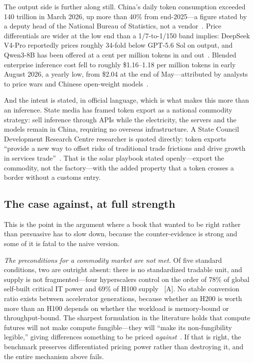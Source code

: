 The output side is further along still. China's daily token consumption exceeded 140 trillion in March 2026, up more than 40\% from end-2025---a figure stated by a deputy head of the National Bureau of Statistics, not a vendor~\cite{china-tokens}. Price differentials are wider at the low end than a 1/7-to-1/150 band implies: DeepSeek V4-Pro reportedly prices roughly 34-fold below GPT-5.6 Sol on output, and Qwen3-8B has been offered at a cent per million tokens in and out~\cite{token-prices}. Blended enterprise inference cost fell to roughly \$1.16--1.18 per million tokens in early August 2026, a yearly low, from \$2.04 at the end of May---attributed by analysts to price wars and Chinese open-weight models~\cite{inference-price-floor}.

And the intent is stated, in official language, which is what makes this more than an inference. State media has framed token export as a national commodity strategy: sell inference through APIs while the electricity, the servers and the models remain in China, requiring no overseas infrastructure. A State Council Development Research Centre researcher is quoted directly: token exports ``provide a new way to offset risks of traditional trade frictions and drive growth in services trade''~\cite{china-token-export}. That is the solar playbook stated openly---export the commodity, not the factory---with the added property that a token crosses a border without a customs entry.

\subsection{The case against, at full strength}

This is the point in the argument where a book that wanted to be right rather than persuasive has to slow down, because the counter-evidence is strong and some of it is fatal to the naive version.

\emph{The preconditions for a commodity market are not met.} Of five standard conditions, two are outright absent: there is no standardized tradable unit, and supply is not fragmented---four hyperscalers control on the order of 78\% of global self-built critical IT power and 69\% of H100 supply~\cite{variant-preconditions} [A]. No stable conversion ratio exists between accelerator generations, because whether an H200 is worth more than an H100 depends on whether the workload is memory-bound or throughput-bound. The sharpest formulation in the literature holds that compute futures will not make compute fungible---they will ``make its non-fungibility legible,'' giving differences something to be priced \emph{against}~\cite{friedman-basis}. If that is right, the benchmark preserves differentiated pricing power rather than destroying it, and the entire mechanism above fails.

